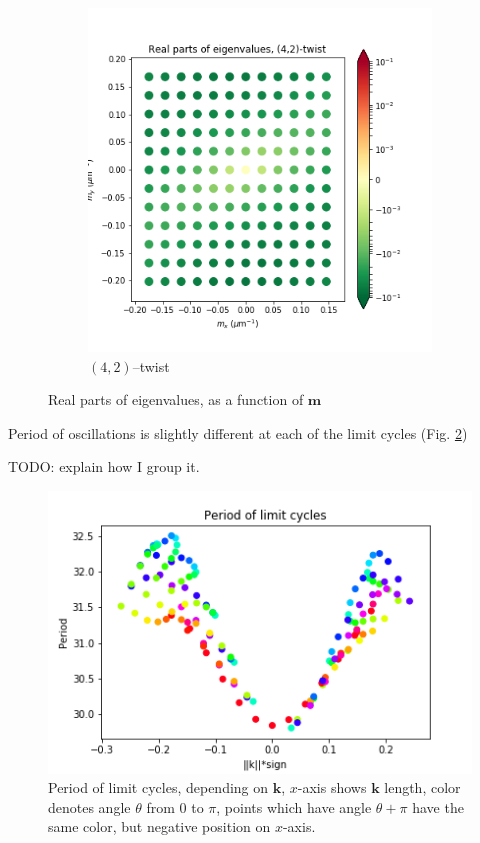 \documentclass[a4paper,10pt]{article}
\renewcommand*{\vec}[1]{\mathbf{#1}}
\begin{document}
\begin{figure}[h]
\begin{subfigure}[h]{.55\textwidth}
  \includegraphics[width=.9\textwidth]{assets/theory-2019-09-05-163949584-d0f.png}
  \caption{$(4,2)$--twist}
\end{subfigure}
\caption{Real parts of eigenvalues, as a function of $\vec{m}$}
\label{fig:evals-m}
\end{figure}

Period of oscillations is slightly different at each of the limit cycles (Fig. \ref{fig:period})

TODO: explain how I group it.

\begin{figure}[h]
    \centering
    \includegraphics[width=.6\textwidth]{assets/period.png}
    \caption{Period of limit cycles, depending on $\vec{k}$, $x$-axis shows $\vec{k}$ length, color denotes angle $\theta$ from $0$ to $\pi$, points which have angle $\theta +\pi$ have the same color, but negative position on $x$-axis.}
    \label{fig:period}
\end{figure}
\end{document}
